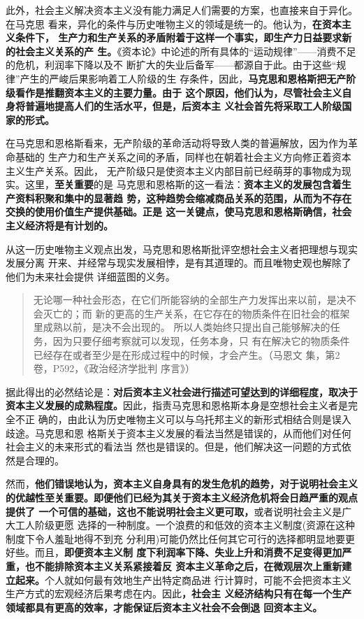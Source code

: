 此外，社会主义解决资本主义没有能力满足人们需要的方案，也直接来自于异化。在马克思
看来，异化的条件与历史唯物主义的领域是统一的。他认为，\textbf{在资本主义条件下，
  生产力和生产关系的矛盾附着于这样一个事实，即生产力日益要求新的社会主义关系的产
  生。}《资本论》中论述的所有具体的“运动规律”——消费不足的危机，利润率下降以及不
断扩大的失业后备军——都源自于此。由于这些“规律”产生的严峻后果影响着工人阶级的生
存条件，因此，\textbf{马克思和恩格斯把无产阶级看作是推翻资本主义的主要力量。由于
  这个原因，他们认为，尽管社会主义自身将普遍地提高人们的生活水平，但是，后资本主
  义社会首先将采取工人阶级国家的形式。}

在马克思和恩格斯看来，无产阶级的革命活动将导致人类的普遍解放，因为作为革命基础的
生产力和生产关系之间的矛盾，同样也在朝着社会主义方向修正着资本主义生产关系。因此，
无产阶级只是使资本主义内部目前已经萌芽的事物成为现实。这里，\textbf{至关重要}的是
马克思和恩格斯的这一看法：\textbf{资本主义的发展包含着生产资料积聚和集中的显著趋
  势，这种趋势会缩减商品关系的范围，从而为不存在交换的使用价值生产提供基础。正是
  这一关键点，使马克思和恩格斯确信，社会主义经济将是有计划的。}

从这一历史唯物主义观点出发，马克思和恩格斯批评空想社会主义者把理想与现实发展分离
开来、并经常与现实发展相悖，是有其道理的。而且唯物史观也解除了他们为未来社会提供
详细蓝图的义务。
\begin{quotation}
  无论哪一种社会形态，在它们所能容纳的全部生产力发挥出来以前，是决不会灭亡的；而
  新的更高的生产关系，在它存在的物质条件在旧社会的框架里成熟以前，是决不会出现的。
  所以人类始终只提出自己能够解决的任务，因为只要仔细考察就可以发现，任务本身，只
  有在解决它的物质条件已经存在或者至少是在形成过程中的时候，才会产生。（马恩文
  集，第2卷，P592，《政治经济学批判 序言》）
\end{quotation}

据此得出的必然结论是：\textbf{对后资本主义社会进行描述可望达到的详细程度，取决于
  资本主义发展的成熟程度。}因此，指责马克思和恩格斯本身是空想社会主义者是完全不正
确的，由此认为历史唯物主义可以与乌托邦主义的新形式相结合则是误入歧途。马克思和恩
格斯关于资本主义发展的看法当然是错误的，从而他们对任何社会主义的未来形式的看法当
然也是错误的。但是，他们解决这一问题的方式依然是合理的。

然而，\textbf{他们错误地认为，资本主义自身具有的发生危机的趋势，对于说明社会主义
  的优越性至关重要。即便他们已经为其关于资本主义经济危机将会日趋严重的观点提供了
  一个可信的基础，这也不能说明社会主义更可取，}或者说明社会主义是广大工人阶级更愿
选择的一种制度。一个浪费的和低效的资本主义制度(资源在这种制度下令人羞耻地得不到充
分利用)可能仍然比任何其它可行的选择都明显地要更好些。而且，\textbf{即便资本主义制
  度下利润率下降、失业上升和消费不足变得更加严重，也不能排除资本主义关系紧接着反
  资本主义革命之后，在微观层次上重新建立起来。}个人就如何最有效地生产出特定商品进
行计算时，可能不会把资本主义生产方式的宏观经济后果考虑在内。因此\textbf{，社会主
  义经济结构只有在每一个生产领域都具有更高的效率，才能保证后资本主义社会不会倒退
  回资本主义。}

